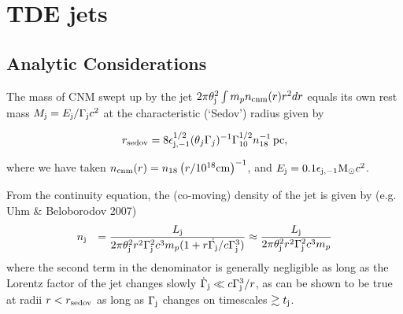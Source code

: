 \documentclass[usenatbib,fleqn]{mnras}
\newcommand{\Msun}{{\rm M_\odot}}
\begin{document}
\section{TDE jets}
\label{sec:jet}

\subsection{Analytic Considerations}
\label{sec:analytic}


The mass of CNM swept up by the jet $2\pi\theta_{\rm j}^{2}\int m_p
n_{\rm cnm}(r) r^{2}dr$ equals its own rest mass $M_{\rm j} = E_{\rm
  j}/\Gamma_{\rm j}c^{2}$ at the characteristic (`Sedov') radius given
by 

\begin{equation}
r_{\rm sedov} = 8 \epsilon_{\rm
  j,-1}^{1/2} (\theta_j
\Gamma_j)^{-1}\Gamma_{10}^{1/2} n_{\rm 18}^{-1}\,{\rm pc}, 
\end{equation}

where we have taken $n_{\rm cnm} (r)=n_{18} \left(r/10^{18} {\rm
    cm}\right)^{-1}$, and $E_{\rm j}=0.1 \epsilon_{\rm j,-1} \Msun
c^2$.

From the continuity equation, the (co-moving) density of the jet is
given by (e.g. Uhm \& Beloborodov 2007)
 \begin{eqnarray}
   &n_{\rm j}& =  \frac{L_{\rm j}}{2\pi \theta_{\rm j}^{2}r^{2}\Gamma_{\rm j}^{2}c^{3}m_p(1 + r \dot{\Gamma_{\rm j}}/c\Gamma_{\rm j}^{3})} \approx  \frac{L_{\rm j}}{2\pi \theta_{\rm j}^{2}r^{2}\Gamma_{\rm j}^{2}c^{3}m_p}
\end{eqnarray}
where the second term in the denominator is generally negligible as
long as the Lorentz factor of the jet changes slowly
$\dot{\Gamma}_{\rm j} \ll c\Gamma_{\rm j}^{3}/r$, as can be shown to
be true at radii $r < r_{\rm sedov}$ as long as $\Gamma_{\rm j}$
changes on timescales $\gtrsim t_{\rm j}$.
\end{document}
